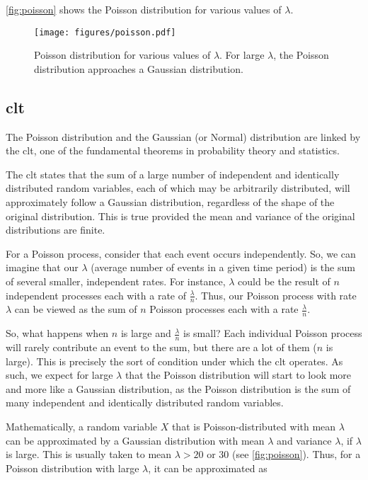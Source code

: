 \autoref{fig:poisson} shows the Poisson distribution for various values of $\lambda$.

\begin{figure}[htb]
    \centering
    \texttt{[image: figures/poisson.pdf]}
    \caption[Poisson distribution for various values of $\lambda$]
    {Poisson distribution for various values of $\lambda$. For large $\lambda$, the Poisson distribution
        approaches a Gaussian distribution.}
    \label{fig:poisson}
\end{figure}

\subsection[Central Limit Theorem]{\gls{clt}}


The Poisson distribution and the Gaussian (or Normal) distribution are linked by the \gls{clt}, one of the
fundamental theorems in probability theory and statistics.

The \gls{clt} states that the sum of a large number of independent and identically distributed random
variables, each of which may be arbitrarily distributed, will approximately follow a Gaussian distribution, regardless
of the shape of the original distribution. This is true provided the mean and variance of the original distributions are
finite.

For a Poisson process, consider that each event occurs independently. So, we can imagine that our $\lambda$ (average
number of events in a given time period) is the sum of several smaller, independent rates. For instance, $\lambda$ could
be the result of $n$ independent processes each with a rate of $\frac{\lambda}{n}$. Thus, our Poisson process with rate
$\lambda$ can be viewed as the sum of $n$ Poisson processes each with a rate $\frac{\lambda}{n}$.

So, what happens when $n$ is large and $\frac{\lambda}{n}$ is small? Each individual Poisson process will rarely
contribute an event to the sum, but there are a lot of them ($n$ is large). This is precisely the sort of condition
under which the \gls{clt} operates. As such, we expect for large $\lambda$ that the Poisson distribution
will start to look more and more like a Gaussian distribution, as the Poisson distribution is the sum of many
independent and identically distributed random variables.

Mathematically, a random variable $X$ that is Poisson-distributed with mean $\lambda$ can be approximated by a Gaussian
distribution with mean $\lambda$ and variance $\lambda$, if $\lambda$ is large. This is usually taken to mean $\lambda >
    20$ or $30$ (see \autoref{fig:poisson}). Thus, for a Poisson distribution with large $\lambda$, it can be
approximated as

